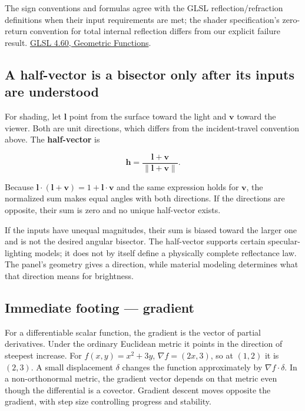 The sign conventions and formulas agree with the GLSL reflection/refraction definitions when their input requirements are met; the shader specification's zero-return convention for total internal reflection differs from our explicit failure result. \href{https://registry.khronos.org/OpenGL/specs/gl/GLSLangSpec.4.60.html\#geometric-functions}{GLSL 4.60, Geometric Functions}.

\subsection{A half-vector is a bisector only after its inputs are understood}\label{01-foundations-i-ch018-a-half-vector-is-a-bisector-only-after-its-inputs-are-understood}

For shading, let \(\mathbf l\) point from the surface toward the light and \(\mathbf v\) toward the viewer. Both are unit directions, which differs from the incident-travel convention above. The \textbf{half-vector} is

\[
\mathbf h=\frac{\mathbf l+\mathbf v}{\|\mathbf l+\mathbf v\|}.
\]

Because \(\mathbf l\cdot(\mathbf l+\mathbf v)=1+\mathbf l\cdot\mathbf v\) and the same expression holds for \(\mathbf v\), the normalized sum makes equal angles with both directions. If the directions are opposite, their sum is zero and no unique half-vector exists.

If the inputs have unequal magnitudes, their sum is biased toward the larger one and is not the desired angular bisector. The half-vector supports certain specular-lighting models; it does not by itself define a physically complete reflectance law. The panel's geometry gives a direction, while material modeling determines what that direction means for brightness.

\subsection{Immediate footing --- gradient}\label{01-foundations-i-ch018-immediate-footing-gradient}

For a differentiable scalar function, the gradient is the vector of partial derivatives. Under the ordinary Euclidean metric it points in the direction of steepest increase. For \(f(x,y)=x^2+3y\), \(\nabla f=(2x,3)\), so at \((1,2)\) it is \((2,3)\). A small displacement \(\delta\) changes the function approximately by \(\nabla f\cdot\delta\). In a non-orthonormal metric, the gradient vector depends on that metric even though the differential is a covector. Gradient descent moves opposite the gradient, with step size controlling progress and stability.

